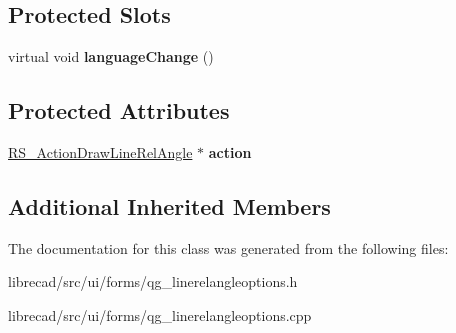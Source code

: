 \subsection*{Protected Slots}
\begin{DoxyCompactItemize}
\item 
\hypertarget{classQG__LineRelAngleOptions_a1da14d6eabc21024ca0d2c2d48026916}{virtual void {\bfseries language\-Change} ()}\label{classQG__LineRelAngleOptions_a1da14d6eabc21024ca0d2c2d48026916}

\end{DoxyCompactItemize}
\subsection*{Protected Attributes}
\begin{DoxyCompactItemize}
\item 
\hypertarget{classQG__LineRelAngleOptions_a3c2f94496b6d84dab8681e763b8ebfb2}{\hyperlink{classRS__ActionDrawLineRelAngle}{R\-S\-\_\-\-Action\-Draw\-Line\-Rel\-Angle} $\ast$ {\bfseries action}}\label{classQG__LineRelAngleOptions_a3c2f94496b6d84dab8681e763b8ebfb2}

\end{DoxyCompactItemize}
\subsection*{Additional Inherited Members}


The documentation for this class was generated from the following files\-:\begin{DoxyCompactItemize}
\item 
librecad/src/ui/forms/qg\-\_\-linerelangleoptions.\-h\item 
librecad/src/ui/forms/qg\-\_\-linerelangleoptions.\-cpp\end{DoxyCompactItemize}

